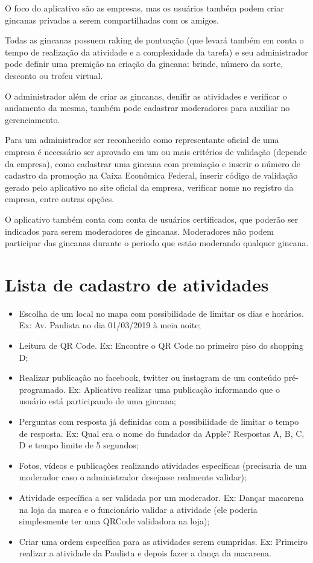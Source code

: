 \documentclass[
    12pt,               %
    openright,          %
    oneside,
    a4paper,            %
    draft,              %
    MODELO,             %
    TODO,               %
    english,            %
    brazil              %
    ]{ifsp-spo-inf-ctds}
\begin{document}
O foco do aplicativo são as empresas, mas os usuários também podem criar gincanas privadas a serem compartilhadas com os amigos.

Todas as gincanas possuem raking de pontuação (que levará também em conta o tempo de realização da atividade e a complexidade da tarefa) e seu administrador pode definir uma premição na criação da gincana: brinde, número da sorte, desconto ou trofeu virtual.

O administrador além de criar as gincanas, denifir as atividades e verificar o andamento da mesma, também pode cadastrar moderadores para auxiliar no gerenciamento. 

Para um administrador ser reconhecido como representante oficial de uma empresa é necessário ser aprovado em um ou mais critérios de validação (depende da empresa), como cadastrar uma gincana com premiação e inserir o número de cadastro da promoção na Caixa Econômica Federal, inserir código de validação gerado pelo aplicativo no site oficial da empresa, verificar nome no registro da empresa, entre outras opções.

O aplicativo também conta com conta de usuários certificados, que poderão ser indicados para serem moderadores de gincanas. Moderadores não podem participar das gincanas durante o periodo que estão moderando qualquer gincana.
 
\section{Lista de cadastro de atividades}
\begin{itemize}
\item Escolha de um local no mapa com possibilidade de limitar os dias e horários. Ex: Av. Paulista no dia 01/03/2019 à meia noite;
\item Leitura de QR Code. Ex: Encontre o QR Code no primeiro piso do shopping D;
\item Realizar publicação no facebook, twitter ou instagram de um conteúdo pré-programado. Ex: Aplicativo realizar uma publicação informando que o usuário está participando de uma gincana;
\item Perguntas com resposta já definidas com a possibilidade de limitar o tempo de resposta. Ex: Qual era o nome do fundador da Apple? Respostas A, B, C, D e tempo limite de 5 segundos;
\item Fotos, vídeos e publicações realizando atividades específicas (precisaria de um moderador caso o administrador desejasse realmente validar);
\item Atividade específica a ser validada por um moderador. Ex: Dançar macarena na loja da marca e o funcionário validar a atividade (ele poderia simplesmente ter uma QRCode validadora na loja);
\item Criar uma ordem específica para as atividades serem cumpridas. Ex: Primeiro realizar a atividade da Paulista e depois fazer a dança da macarena.
\end{itemize}
\end{document}
